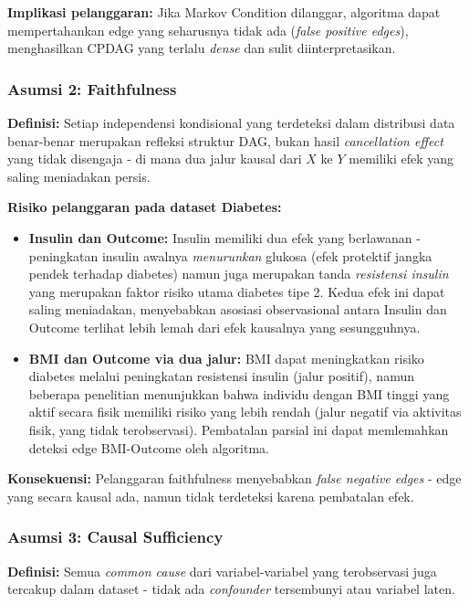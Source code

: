 \documentclass[
  11pt,
]{article}
\providecommand{\tightlist}{%
  \setlength{\itemsep}{0pt}\setlength{\parskip}{0pt}}
\begin{document}
\textbf{Implikasi pelanggaran:} Jika Markov Condition dilanggar,
algoritma dapat mempertahankan edge yang seharusnya tidak ada
(\emph{false positive edges}), menghasilkan CPDAG yang terlalu
\emph{dense} dan sulit diinterpretasikan.

\subsubsection{Asumsi 2: Faithfulness}\label{asumsi-2-faithfulness}

\textbf{Definisi:} Setiap independensi kondisional yang terdeteksi dalam
distribusi data benar-benar merupakan refleksi struktur DAG, bukan hasil
\emph{cancellation effect} yang tidak disengaja - di mana dua jalur
kausal dari \(X\) ke \(Y\) memiliki efek yang saling meniadakan persis.

\textbf{Risiko pelanggaran pada dataset Diabetes:}

\begin{itemize}
\tightlist
\item
  \textbf{Insulin dan Outcome:} Insulin memiliki dua efek yang
  berlawanan - peningkatan insulin awalnya \emph{menurunkan} glukosa
  (efek protektif jangka pendek terhadap diabetes) namun juga merupakan
  tanda \emph{resistensi insulin} yang merupakan faktor risiko utama
  diabetes tipe 2. Kedua efek ini dapat saling meniadakan, menyebabkan
  asosiasi observasional antara Insulin dan Outcome terlihat lebih lemah
  dari efek kausalnya yang sesungguhnya.
\item
  \textbf{BMI dan Outcome via dua jalur:} BMI dapat meningkatkan risiko
  diabetes melalui peningkatan resistensi insulin (jalur positif), namun
  beberapa penelitian menunjukkan bahwa individu dengan BMI tinggi yang
  aktif secara fisik memiliki risiko yang lebih rendah (jalur negatif
  via aktivitas fisik, yang tidak terobservasi). Pembatalan parsial ini
  dapat memlemahkan deteksi edge BMI-Outcome oleh algoritma.
\end{itemize}

\textbf{Konsekuensi:} Pelanggaran faithfulness menyebabkan \emph{false
negative edges} - edge yang secara kausal ada, namun tidak terdeteksi
karena pembatalan efek.

\subsubsection{Asumsi 3: Causal
Sufficiency}\label{asumsi-3-causal-sufficiency}

\textbf{Definisi:} Semua \emph{common cause} dari variabel-variabel yang
terobservasi juga tercakup dalam dataset - tidak ada \emph{confounder}
tersembunyi atau variabel laten.
\end{document}
